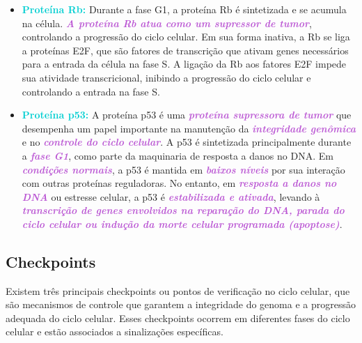 \documentclass[11pt,a4paper]{article}
\begin{document}
	\begin{itemize}[label=\textcolor{CarnationPink}{$\blacktriangleright$}]
		\item \textcolor{DarkTurquoise}{\textbf{Proteína Rb:}} Durante a fase G1, a proteína Rb é sintetizada e se acumula na célula. \textcolor{MediumOrchid}{\textbf{\textit{A proteína Rb atua como um supressor de tumor}}}, controlando a progressão do ciclo celular. Em sua forma inativa, a Rb se liga a proteínas E2F, que são fatores de transcrição que ativam genes necessários para a entrada da célula na fase S. A ligação da Rb aos fatores E2F impede sua atividade transcricional, inibindo a progressão do ciclo celular e controlando a entrada na fase S.
		\item \textcolor{DarkTurquoise}{\textbf{Proteína p53:}} A proteína p53 é uma \textcolor{MediumOrchid}{\textbf{\textit{proteína supressora de tumor}}} que desempenha um papel importante na manutenção da \textcolor{MediumOrchid}{\textbf{\textit{integridade genômica}}} e no \textcolor{MediumOrchid}{\textbf{\textit{controle do ciclo celular}}}. A p53 é sintetizada principalmente durante a \textcolor{MediumOrchid}{\textbf{\textit{fase G1}}}, como parte da maquinaria de resposta a danos no DNA. Em \textcolor{MediumOrchid}{\textbf{\textit{condições normais}}}, a p53 é mantida em \textcolor{MediumOrchid}{\textbf{\textit{baixos níveis}}} por sua interação com outras proteínas reguladoras. No entanto, em \textcolor{MediumOrchid}{\textbf{\textit{resposta a danos no DNA}}} ou estresse celular, a p53 é \textcolor{MediumOrchid}{\textbf{\textit{estabilizada e ativada}}}, levando à \textcolor{MediumOrchid}{\textbf{\textit{transcrição de genes envolvidos na reparação do DNA, parada do ciclo celular ou indução da morte celular programada (apoptose)}}}.
	\end{itemize}
	
\subsection*{Checkpoints}

	Existem três principais checkpoints ou pontos de verificação no ciclo celular, que são mecanismos de controle que garantem a integridade do genoma e a progressão adequada do ciclo celular. Esses checkpoints ocorrem em diferentes fases do ciclo celular e estão associados a sinalizações específicas.
\end{document}
